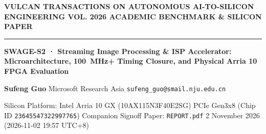 \documentclass[11pt,a4paper]{article}
\begin{document}
{\scriptsize\sffamily\textcolor{vulcan}{\textbf{VULCAN TRANSACTIONS ON AUTONOMOUS AI-TO-SILICON ENGINEERING \hfill VOL. 2026 \textperiodcentered{} ACADEMIC BENCHMARK \& SILICON PAPER}}\par}

\vspace{1pt}\textcolor{vulcan}{\rule{\textwidth}{1.2pt}}\vspace{3pt}

\begin{center}

{\sffamily\LARGE\bfseries SWAGE-S2 · Streaming Image Processing \& ISP Accelerator: Microarchitecture, 100~MHz+ Timing Closure, and Physical Arria 10 FPGA Evaluation\par}\vspace{3pt}

{\small\sffamily\textbf{Sufeng Guo} \textperiodcentered{} Microsoft Research Asia \textperiodcentered{} \texttt{sufeng\_guo@smail.nju.edu.cn}\par}\vspace{1pt}

{\scriptsize\sffamily\textcolor{black!75}{Silicon Platform: Intel Arria 10 GX (\allowbreak{}10AX115N3F40E2SG)\allowbreak{} PCIe Gen3x8 (Chip ID \texttt{23645547322997765}) \textperiodcentered{} Companion Signoff Paper: \texttt{REPORT.pdf} \textperiodcentered{} 2 November 2026 (\allowbreak{}2026-11-02 19:57 UTC+\allowbreak{}8)\allowbreak{}}\par}

\end{center}\vspace{2pt}
\end{document}
